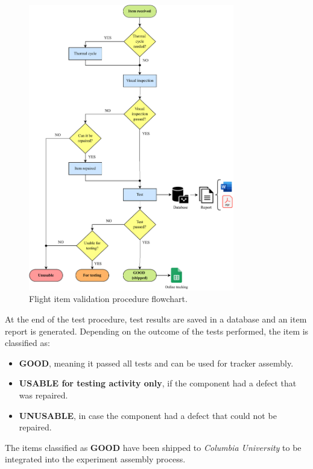 \begin{figure}[h!]
    \centering
    \includegraphics[width=0.8\textwidth]{Images/chap2/flight_item_validation_procedure.drawio.pdf}
    \caption{Flight item validation procedure flowchart.}
    \label{figFlowChart}
\end{figure}

At the end of the test procedure, test results are saved in a database and an item report is generated. Depending on the outcome of the tests performed, the item is classified as:

\begin{itemize}
    \item \textbf{GOOD}, meaning it passed all tests and can be used for tracker assembly.
    \item \textbf{USABLE for testing activity only}, if the component had a defect that was repaired.
    \item \textbf{UNUSABLE}, in case the component had a defect that could not be repaired.
\end{itemize}

\par
\noindent
The items classified as \textbf{GOOD} have been shipped to \textit{Columbia University} to be integrated into the experiment assembly process.


